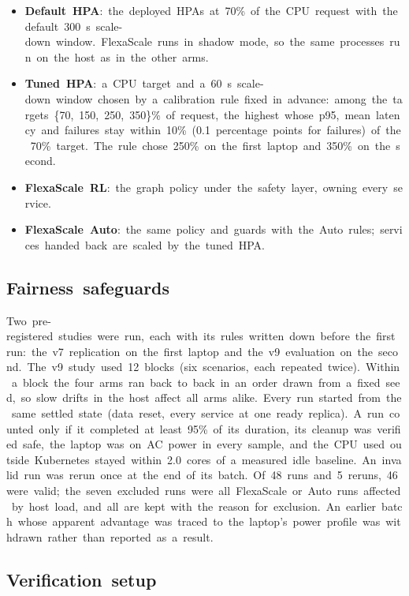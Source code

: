 \documentclass[12pt,a4paper,oneside]{report}
\begin{document}
\begin{itemize}\setlength{\itemsep}{1pt}
  \item \textbf{Default~HPA}:~the~deployed~HPAs~at~70\%~of~the~CPU~request~with~the~default~300~s~scale-down~window.~FlexaScale~runs~in~shadow~mode,~so~the~same~processes~run~on~the~host~as~in~the~other~arms.
  \item \textbf{Tuned~HPA}:~a~CPU~target~and~a~60~s~scale-down~window~chosen~by~a~calibration~rule~fixed~in~advance:~among~the~targets~\{70,~150,~250,~350\}\%~of~request,~the~highest~whose~p95,~mean~latency~and~failures~stay~within~10\%~(0.1~percentage~points~for~failures)~of~the~70\%~target.~The~rule~chose~250\%~on~the~first~laptop~and~350\%~on~the~second.
  \item \textbf{FlexaScale~RL}:~the~graph~policy~under~the~safety~layer,~owning~every~service.
  \item \textbf{FlexaScale~Auto}:~the~same~policy~and~guards~with~the~Auto~rules;~services~handed~back~are~scaled~by~the~tuned~HPA.
\end{itemize}

\subsection{Fairness~safeguards}

Two~pre-registered~studies~were~run,~each~with~its~rules~written~down~before~the~first~run:~the~v7~replication~on~the~first~laptop~and~the~v9~evaluation~on~the~second.~The~v9~study~used~12~blocks~(six~scenarios,~each~repeated~twice).~Within~a~block~the~four~arms~ran~back~to~back~in~an~order~drawn~from~a~fixed~seed,~so~slow~drifts~in~the~host~affect~all~arms~alike.~Every~run~started~from~the~same~settled~state~(data~reset,~every~service~at~one~ready~replica).~A~run~counted~only~if~it~completed~at~least~95\%~of~its~duration,~its~cleanup~was~verified~safe,~the~laptop~was~on~AC~power~in~every~sample,~and~the~CPU~used~outside~Kubernetes~stayed~within~2.0~cores~of~a~measured~idle~baseline.~An~invalid~run~was~rerun~once~at~the~end~of~its~batch.~Of~48~runs~and~5~reruns,~46~were~valid;~the~seven~excluded~runs~were~all~FlexaScale~or~Auto~runs~affected~by~host~load,~and~all~are~kept~with~the~reason~for~exclusion.~An~earlier~batch~whose~apparent~advantage~was~traced~to~the~laptop's~power~profile~was~withdrawn~rather~than~reported~as~a~result.


\subsection{Verification~setup}
\end{document}
